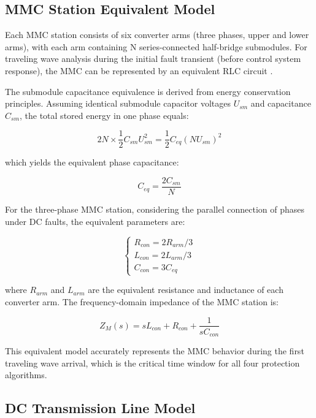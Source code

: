 \documentclass[journal]{IEEEtran}
\begin{document}
\subsection{MMC Station Equivalent Model}
\label{subsec:mmc_model}

Each MMC station consists of six converter arms (three phases, upper and lower arms), with each arm containing N series-connected half-bridge submodules. For traveling wave analysis during the initial fault transient (before control system response), the MMC can be represented by an equivalent RLC circuit \cite{reference_paper_frechet, debnath2015, tu2011}.

The submodule capacitance equivalence is derived from energy conservation principles. Assuming identical submodule capacitor voltages $U_{sm}$ and capacitance $C_{sm}$, the total stored energy in one phase equals:

\begin{equation}
2N \times \frac{1}{2}C_{sm}U^2_{sm} = \frac{1}{2}C_{eq}(NU_{sm})^2
\end{equation}

which yields the equivalent phase capacitance:

\begin{equation}
C_{eq} = \frac{2C_{sm}}{N}
\end{equation}

For the three-phase MMC station, considering the parallel connection of phases under DC faults, the equivalent parameters are:

\begin{equation}
\begin{cases}
R_{con} = 2R_{arm}/3 \\
L_{con} = 2L_{arm}/3 \\
C_{con} = 3C_{eq}
\end{cases}
\end{equation}

where $R_{arm}$ and $L_{arm}$ are the equivalent resistance and inductance of each converter arm. The frequency-domain impedance of the MMC station is:

\begin{equation}
Z_M(s) = sL_{con} + R_{con} + \frac{1}{sC_{con}}
\end{equation}

This equivalent model accurately represents the MMC behavior during the first traveling wave arrival, which is the critical time window for all four protection algorithms.

\subsection{DC Transmission Line Model}
\end{document}
